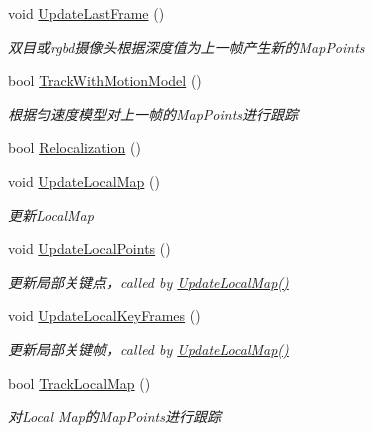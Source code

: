 \begin{DoxyCompactItemize}
void \mbox{\hyperlink{class_o_r_b___s_l_a_m2_1_1_tracking_aa84a20277d5bd022b527d79a58830bc5}{Update\+Last\+Frame}} ()
\begin{DoxyCompactList}\small\item\em 双目或rgbd摄像头根据深度值为上一帧产生新的\+Map\+Points \end{DoxyCompactList}\item 
bool \mbox{\hyperlink{class_o_r_b___s_l_a_m2_1_1_tracking_aca19f1d69b30a6c6e49281d422ac8298}{Track\+With\+Motion\+Model}} ()
\begin{DoxyCompactList}\small\item\em 根据匀速度模型对上一帧的\+Map\+Points进行跟踪 \end{DoxyCompactList}\item 
bool \mbox{\hyperlink{class_o_r_b___s_l_a_m2_1_1_tracking_acd4ea9e7097bed16428a4b78fe4b6a67}{Relocalization}} ()
\item 
void \mbox{\hyperlink{class_o_r_b___s_l_a_m2_1_1_tracking_a22723e9972c18a888dd51a82eec27b0a}{Update\+Local\+Map}} ()
\begin{DoxyCompactList}\small\item\em 更新\+Local\+Map \end{DoxyCompactList}\item 
void \mbox{\hyperlink{class_o_r_b___s_l_a_m2_1_1_tracking_a25843575116bf18c065d6cc7645f5b26}{Update\+Local\+Points}} ()
\begin{DoxyCompactList}\small\item\em 更新局部关键点，called by \mbox{\hyperlink{class_o_r_b___s_l_a_m2_1_1_tracking_a22723e9972c18a888dd51a82eec27b0a}{Update\+Local\+Map()}} \end{DoxyCompactList}\item 
void \mbox{\hyperlink{class_o_r_b___s_l_a_m2_1_1_tracking_a42bed56bbbe8282eb77733e7168d8599}{Update\+Local\+Key\+Frames}} ()
\begin{DoxyCompactList}\small\item\em 更新局部关键帧，called by \mbox{\hyperlink{class_o_r_b___s_l_a_m2_1_1_tracking_a22723e9972c18a888dd51a82eec27b0a}{Update\+Local\+Map()}} \end{DoxyCompactList}\item 
bool \mbox{\hyperlink{class_o_r_b___s_l_a_m2_1_1_tracking_af670c614f4e10d58c9f7aad9865b5c08}{Track\+Local\+Map}} ()
\begin{DoxyCompactList}\small\item\em 对\+Local Map的\+Map\+Points进行跟踪 \end{DoxyCompactList}\item 

\end{DoxyCompactItemize}
